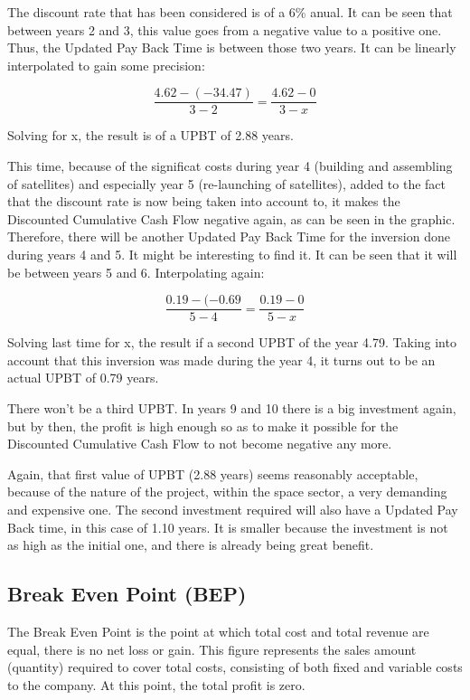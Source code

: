 The discount rate that has been considered is of a 6\% anual. It can be seen that between years 2 and 3, this value goes from a negative value to a positive one. Thus, the Updated Pay Back Time is between those two years. It can be linearly interpolated to gain some precision:

\begin{equation}
\frac{4.62-(-34.47)}{3-2}=\frac{4.62-0}{3-x}
\end{equation}

Solving for x, the result is of a UPBT of 2.88 years.

This time, because of the significat costs during year 4 (building and assembling of satellites) and especially year 5 (re-launching of satellites), added to the fact that the discount rate is now being taken into account to, it makes the Discounted Cumulative Cash Flow negative again, as can be seen in the graphic. Therefore, there will be another Updated Pay Back Time for the inversion done during years 4 and 5. It might be interesting to find it. It can be seen that it will be between years 5 and 6. Interpolating again:

\begin{equation}
\frac{0.19-(-0.69}{5-4}=\frac{0.19-0}{5-x}
\end{equation}

Solving last time for x, the result if a second UPBT of the year 4.79. Taking into account that this inversion was made during the year 4, it turns out to be an actual UPBT of 0.79 years.

There won't be a third UPBT. In years 9 and 10 there is a big investment again, but by then, the profit is high enough so as to make it possible for the Discounted Cumulative Cash Flow to not become negative any more. 

Again, that first value of UPBT (2.88 years) seems reasonably acceptable, because of the nature of the project, within the space sector, a very demanding and expensive one. The second investment required will also have a Updated Pay Back time, in this case of 1.10 years. It is smaller because the investment is not as high as the initial one, and there is already being great benefit. 

\subsection{Break Even Point (BEP)}
The Break Even Point is the point at which total cost and total revenue are equal, there is no net loss or gain. This figure represents the sales amount (quantity) required to cover total costs, consisting of both fixed and variable costs to the company. At this point, the total profit is zero. 

